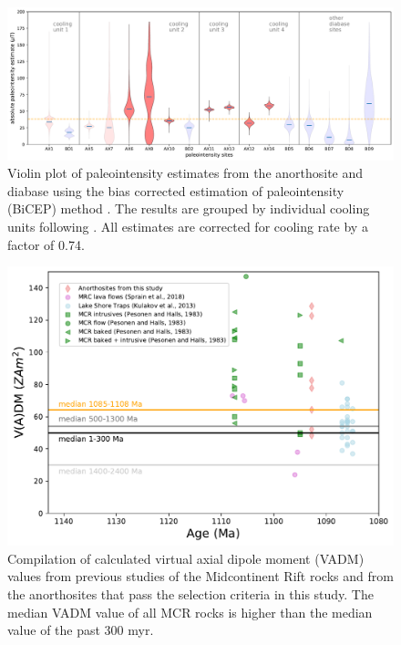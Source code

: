 \documentclass[draft]{agujournal2019}
\begin{document}
\begin{figure}[h!]
\noindent\includegraphics[width=\textwidth]{code/code_output/AX_BD_BiCEP.pdf}
\centering
\caption{\footnotesize{Violin plot of paleointensity estimates from the anorthosite and diabase using the bias corrected estimation of paleointensity (BiCEP) method \cite{Cych2021a}. The results are grouped by individual cooling units following . All estimates are corrected for cooling rate by a factor of 0.74. }}
\label{fig:BiCEP}
\end{figure}

\begin{figure}[h!]
\noindent\includegraphics[width=\textwidth]{MCR_VADM.pdf}
\centering
\caption{\footnotesize{Compilation of calculated virtual axial dipole moment (VADM) values from previous studies of the Midcontinent Rift rocks \cite{Pesonen1983a, Kulakov2013a, Sprain2018a} and from the anorthosites that pass the selection criteria in this study. The median VADM value of all MCR rocks is higher than the median value of the past 300 myr. }}
\label{fig:MCR_VADM}
\end{figure}
\end{document}
